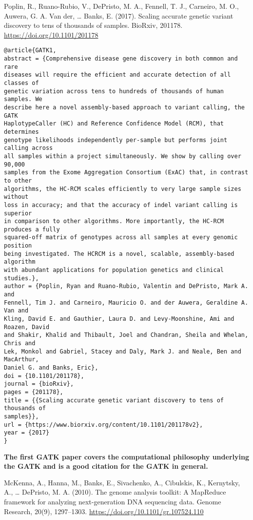 \documentclass[]{article}
\begin{document}
Poplin, R., Ruano-Rubio, V., DePristo, M. A., Fennell, T. J., Carneiro, M. O., Auwera, G. A. Van der, … Banks, E. (2017). Scaling accurate genetic variant discovery to tens of thousands of samples. BioRxiv, 201178. \url{https://doi.org/10.1101/201178}

\begin{verbatim}
@article{GATK1,
abstract = {Comprehensive disease gene discovery in both common and rare
diseases will require the efficient and accurate detection of all classes of
genetic variation across tens to hundreds of thousands of human samples. We
describe here a novel assembly-based approach to variant calling, the GATK
HaplotypeCaller (HC) and Reference Confidence Model (RCM), that determines
genotype likelihoods independently per-sample but performs joint calling across
all samples within a project simultaneously. We show by calling over 90,000
samples from the Exome Aggregation Consortium (ExAC) that, in contrast to other
algorithms, the HC-RCM scales efficiently to very large sample sizes without
loss in accuracy; and that the accuracy of indel variant calling is superior
in comparison to other algorithms. More importantly, the HC-RCM produces a fully
squared-off matrix of genotypes across all samples at every genomic position
being investigated. The HCRCM is a novel, scalable, assembly-based algorithm
with abundant applications for population genetics and clinical studies.},
author = {Poplin, Ryan and Ruano-Rubio, Valentin and DePristo, Mark A. and
Fennell, Tim J. and Carneiro, Mauricio O. and der Auwera, Geraldine A. Van and
Kling, David E. and Gauthier, Laura D. and Levy-Moonshine, Ami and Roazen, David
and Shakir, Khalid and Thibault, Joel and Chandran, Sheila and Whelan, Chris and
Lek, Monkol and Gabriel, Stacey and Daly, Mark J. and Neale, Ben and MacArthur,
Daniel G. and Banks, Eric},
doi = {10.1101/201178},
journal = {bioRxiv},
pages = {201178},
title = {{Scaling accurate genetic variant discovery to tens of thousands of
samples}},
url = {https://www.biorxiv.org/content/10.1101/201178v2},
year = {2017}
}
\end{verbatim}

\textbf{The first GATK paper covers the computational philosophy underlying the GATK and is a good citation for the GATK in general.}


McKenna, A., Hanna, M., Banks, E., Sivachenko, A., Cibulskis, K., Kernytsky, A., … DePristo, M. A. (2010). The genome analysis toolkit: A MapReduce framework for analyzing next-generation DNA sequencing data. Genome Research, 20(9), 1297–1303. \url{https://doi.org/10.1101/gr.107524.110}
\end{document}
